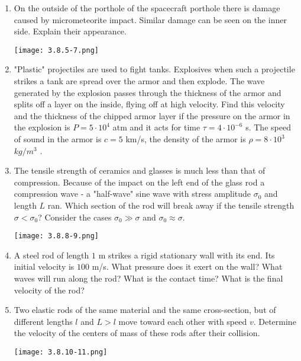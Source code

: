\documentclass{article}
\begin{document}
\begin{enumerate}[label=3.8.\arabic*]
\item On the outside of the porthole of the spacecraft porthole there is damage caused by micrometeorite impact. Similar damage can be seen on the inner side. Explain their appearance.

\begin{center}
    \texttt{[image: 3.8.5-7.png]}
\end{center}

\item "Plastic" projectiles are used to fight tanks. Explosives when such a projectile strikes a tank are spread over the armor and then explode. The wave generated by the explosion passes through the thickness of the armor and splits off a layer on the inside, flying off at high velocity. Find this velocity and the thickness of the chipped armor layer if the pressure on the armor in the explosion is $P = 5 \cdot 10^4$ atm and it acts for time $\tau = 4 \cdot 10^{-6}$ s. The speed of sound in the armor is $c = 5$ km/s, the density of the armor is $\rho = 8 \cdot 10^3$ $kg/m^3$ .

\item The tensile strength of ceramics and glasses is much less than that of compression. Because of the impact on the left end of the glass rod a compression wave - a "half-wave" sine wave with stress amplitude $\sigma_0$ and length $L$ ran. Which section of the rod will break away if the tensile strength $\sigma < \sigma_0$? Consider the cases $\sigma_0 \gg  \sigma$ and $\sigma_0 \approx \sigma$.

\begin{center}
    \texttt{[image: 3.8.8-9.png]}
\end{center}

\item A steel rod of length $1$ m strikes a rigid stationary wall with its end. Its initial velocity is $100$ m/s. What pressure does it exert on the wall? What waves will run along the rod? What is the contact time? What is the final velocity of the rod?

\item Two elastic rods of the same material and the same cross-section, but of different lengths $l$ and $L > l$ move toward each other with speed $v$. Determine the velocity of the centers of mass of these rods after their collision.

\begin{center}
    \texttt{[image: 3.8.10-11.png]}
\end{center}


\end{enumerate}
\end{document}
